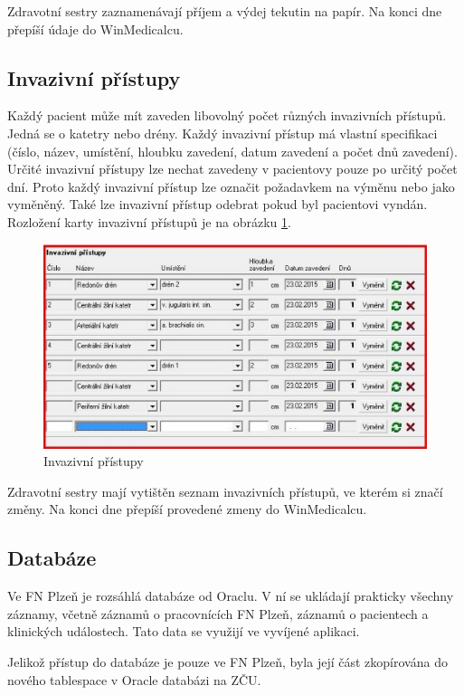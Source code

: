 Zdravotní sestry zaznamenávají příjem a výdej tekutin na papír. Na konci dne přepíší údaje do WinMedicalcu.

\subsection{Invazivní přístupy}

Každý pacient může mít zaveden libovolný počet různých invazivních přístupů. Jedná se o katetry nebo drény. Každý invazivní přístup má vlastní specifikaci (číslo, název, umístění, hloubku zavedení, datum zavedení a počet dnů zavedení). Určité invazivní přístupy lze nechat zavedeny v pacientovy pouze po určitý počet dní. Proto každý invazivní přístup lze označit požadavkem na výměnu nebo jako vyměněný. Také lze invazivní přístup odebrat pokud byl pacientovi vyndán. Rozložení karty invazivní přístupů je na obrázku \ref{fig:WM_invazivni_pristupy}.

\begin{figure}[H]
	\centering
	\includegraphics[width=1\textwidth]{img/medicalc/WM_invazivni_pristupy.eps}
	\caption{Invazivní přístupy}
  \label{fig:WM_invazivni_pristupy}
\end{figure}

Zdravotní sestry mají vytištěn seznam invazivních přístupů, ve kterém si značí změny. Na konci dne přepíší provedené zmeny do WinMedicalcu.

\subsection{Databáze}

Ve FN Plzeň je rozsáhlá databáze od Oraclu. V ní se ukládají prakticky všechny záznamy, včetně záznamů o pracovnících FN Plzeň, záznamů o pacientech a klinických událostech. Tato data se využijí ve vyvíjené aplikaci.

Jelikož přístup do databáze je pouze ve FN Plzeň, byla její část zkopírována do nového tablespace v Oracle databázi na ZČU.